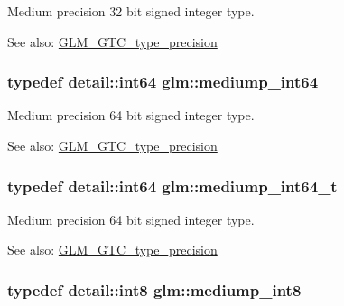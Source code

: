Medium precision 32 bit signed integer type. \begin{Desc}
\item[See also:]\hyperlink{group__gtc__type__precision}{GLM\_\-GTC\_\-type\_\-precision} \end{Desc}
\hypertarget{group__gtc__type__precision_g603c695fe5cd677d3f72a81343e19a74}{
\subsubsection[mediump\_\-int64]{\setlength{\rightskip}{0pt plus 5cm}typedef detail::int64 {\bf glm::mediump\_\-int64}}}
\label{group__gtc__type__precision_g603c695fe5cd677d3f72a81343e19a74}


Medium precision 64 bit signed integer type. \begin{Desc}
\item[See also:]\hyperlink{group__gtc__type__precision}{GLM\_\-GTC\_\-type\_\-precision} \end{Desc}
\hypertarget{group__gtc__type__precision_g555a2f85641550c232db473a9bb981f7}{
\subsubsection[mediump\_\-int64\_\-t]{\setlength{\rightskip}{0pt plus 5cm}typedef detail::int64 {\bf glm::mediump\_\-int64\_\-t}}}
\label{group__gtc__type__precision_g555a2f85641550c232db473a9bb981f7}


Medium precision 64 bit signed integer type. \begin{Desc}
\item[See also:]\hyperlink{group__gtc__type__precision}{GLM\_\-GTC\_\-type\_\-precision} \end{Desc}
\hypertarget{group__gtc__type__precision_g3ee8faab2278c44c5785af04b7b18a14}{
\subsubsection[mediump\_\-int8]{\setlength{\rightskip}{0pt plus 5cm}typedef detail::int8 {\bf glm::mediump\_\-int8}}}
\label{group__gtc__type__precision_g3ee8faab2278c44c5785af04b7b18a14}


